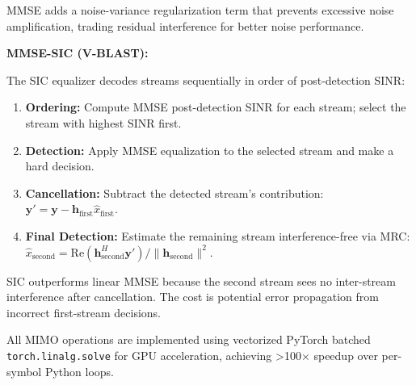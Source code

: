 MMSE adds a noise-variance regularization term that prevents excessive noise amplification, trading residual interference for better noise performance.

\textbf{MMSE-SIC (V-BLAST):}

The SIC equalizer decodes streams sequentially in order of post-detection SINR:

\begin{enumerate}
\def\labelenumi{\arabic{enumi}.}
\tightlist
\item
  \textbf{Ordering:} Compute MMSE post-detection SINR for each stream; select the stream with highest SINR first.
\item
  \textbf{Detection:} Apply MMSE equalization to the selected stream and make a hard decision.
\item
  \textbf{Cancellation:} Subtract the detected stream's contribution: \(\mathbf{y}' = \mathbf{y} - \mathbf{h}_{\text{first}} \hat{x}_{\text{first}}\).
\item
  \textbf{Final Detection:} Estimate the remaining stream interference-free via MRC: \(\hat{x}_{\text{second}} = \text{Re}(\mathbf{h}_{\text{second}}^H \mathbf{y}') / \|\mathbf{h}_{\text{second}}\|^2\).
\end{enumerate}

SIC outperforms linear MMSE because the second stream sees no inter-stream interference after cancellation. The cost is potential error propagation from incorrect first-stream decisions.

All MIMO operations are implemented using vectorized PyTorch batched \texttt{torch.linalg.solve} for GPU acceleration, achieving \textgreater100× speedup over per-symbol Python loops.

